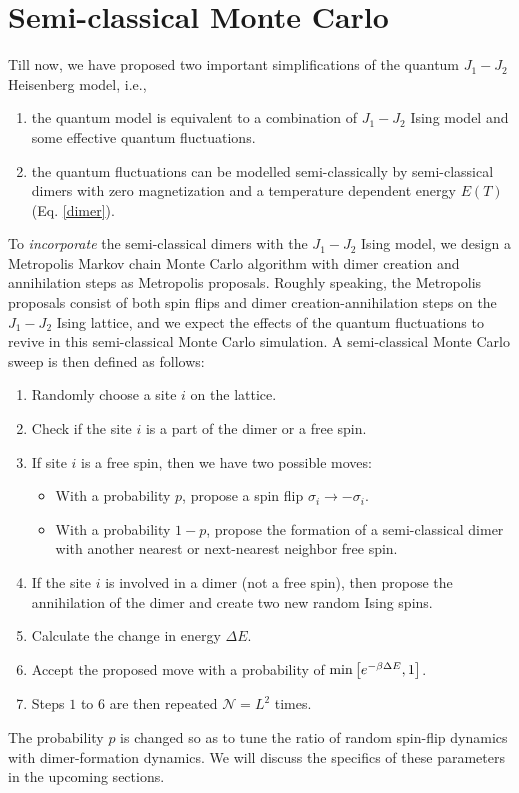 \documentclass[../journal_main.tex]{subfiles}
\begin{document}
\section{Semi-classical Monte Carlo}
Till now, we have proposed two important simplifications of the quantum $J_1-J_2$ Heisenberg model, i.e., 
\begin{enumerate}
    \item the quantum model is equivalent to a combination of $J_1-J_2$ Ising model and some effective quantum fluctuations.
    \item the quantum fluctuations can be modelled semi-classically by semi-classical dimers with zero magnetization and a temperature dependent energy $E(T)$ (Eq. \eqref{dimer}).
\end{enumerate}
To \textit{incorporate} the semi-classical dimers with the $J_1-J_2$ Ising model, we design a Metropolis Markov chain Monte Carlo algorithm with dimer creation and annihilation steps as Metropolis proposals. Roughly speaking, the Metropolis proposals consist of both spin flips and dimer creation-annihilation steps on the $J_1-J_2$ Ising lattice, and we expect the effects of the quantum fluctuations to revive in this semi-classical Monte Carlo simulation. A semi-classical Monte Carlo sweep is then defined as follows:
\begin{enumerate}
    \setlength\itemsep{0.1em}
    \item Randomly choose a site $i$ on the lattice.
    \item Check if the site $i$ is a part of the dimer or a free spin. 
    
    \item If site $i$ is a free spin, then we have two possible moves:
    \begin{itemize}[label={\textbf{--}}]
        \setlength{\itemsep}{0.1em}
        \item With a probability $p$, propose a spin flip $\sigma_i \to -\sigma_i$.
        \item With a probability $1-p$, propose the formation of a semi-classical dimer with another nearest or next-nearest neighbor free spin.
    \end{itemize}
    \item If the site $i$ is involved in a dimer (not a free spin), then propose the annihilation of the dimer and create two new random Ising spins. 
    \item Calculate the change in energy $\Delta E$. 
    \item Accept the proposed move with a probability of $\min \qty[e^{-\beta \Delta E}, 1]$.
    \item Steps $1$ to $6$ are then repeated $\mathcal{N} = L^2$ times.
\end{enumerate}
The probability $p$ is changed so as to tune the ratio of random spin-flip dynamics with dimer-formation dynamics. We will discuss the specifics of these parameters in the upcoming sections.
\end{document}
